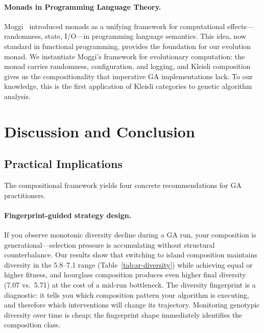 \documentclass[sigconf,anonymous]{acmart}
\begin{document}
\paragraph{Monads in Programming Language Theory.}
Moggi~\cite{moggi1991notions} introduced monads as a unifying framework for computational effects---randomness, state, I/O---in programming language semantics. This idea, now standard in functional programming, provides the foundation for our evolution monad. We instantiate Moggi's framework for evolutionary computation: the monad carries randomness, configuration, and logging, and Kleisli composition gives us the compositionality that imperative GA implementations lack. To our knowledge, this is the first application of Kleisli categories to genetic algorithm analysis.

\section{Discussion and Conclusion}

\subsection{Practical Implications}

The compositional framework yields four concrete recommendations for GA practitioners.

\paragraph{Fingerprint-guided strategy design.}
If you observe monotonic diversity decline during a GA run, your composition is generational---selection pressure is accumulating without structural counterbalance. Our results show that switching to island composition maintains diversity in the 5.8--7.1 range (Table~\ref{tab:sr-diversity}) while achieving equal or higher fitness, and hourglass composition produces even higher final diversity (7.07 vs.\ 5.71) at the cost of a mid-run bottleneck. The diversity fingerprint is a diagnostic: it tells you which composition pattern your algorithm is executing, and therefore which interventions will change its trajectory. Monitoring genotypic diversity over time is cheap; the fingerprint shape immediately identifies the composition class.
\end{document}
